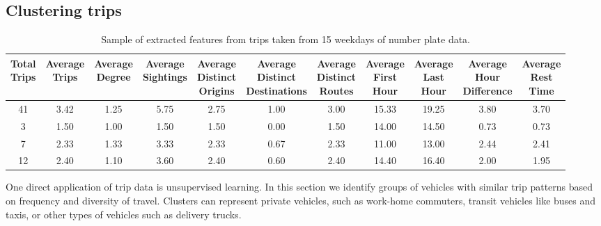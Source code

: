 \subsection{Clustering trips}\label{s.classification}

\begin{table*}[t]
\centering
\begin{tabular}{c c c c c c c c c c c}
  \hline
 \thead{Total\\Trips} & \thead{Average\\Trips} & \thead{Average\\Degree} & \thead{Average\\Sightings} & \thead{Average\\Distinct\\Origins} & \thead{Average\\Distinct\\Destinations} & \thead{Average\\Distinct\\Routes} & \thead{Average\\First\\Hour} & \thead{Average\\Last\\Hour} & \thead{Average\\Hour\\Difference} & \thead{Average\\Rest\\Time} \\
  \hline
41 & 3.42 & 1.25 & 5.75 & 2.75 & 1.00 & 3.00 & 15.33 & 19.25 & 3.80 & 3.70 \\
3 & 1.50 & 1.00 & 1.50 & 1.50 & 0.00 & 1.50 & 14.00 & 14.50 & 0.73 & 0.73 \\
7 & 2.33 & 1.33 & 3.33 & 2.33 & 0.67 & 2.33 & 11.00 & 13.00 & 2.44 & 2.41 \\
12 & 2.40 & 1.10 & 3.60 & 2.40 & 0.60 & 2.40 & 14.40 & 16.40 & 2.00 & 1.95 \\
   \hline
\end{tabular}
\caption{Sample of extracted features from trips taken from 15 weekdays of number plate data.}
\vspace{-0.2cm}
\label{t:features}
\end{table*}

One direct application of trip data is unsupervised learning. In this section we identify groups of vehicles with similar trip patterns based on frequency and diversity of travel. Clusters can represent private vehicles, such as work-home commuters, transit vehicles like buses and taxis, or other types of vehicles such as delivery trucks.

